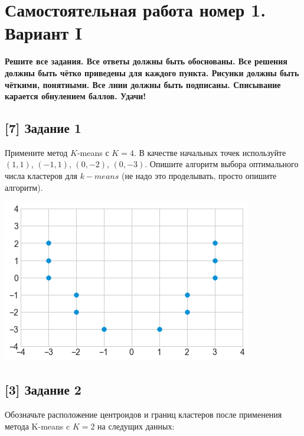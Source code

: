 \documentclass[12pt, a4paper, oneside]{article}
\begin{document}
\section*{Самостоятельная работа номер 1. Вариант I}

\textbf{Решите все задания. Все ответы должны быть обоснованы. Все решения должны быть чётко приведены для каждого пункта. Рисунки должны быть чёткими, понятными. Все лнии должны быть подписаны. Списывание карается обнулением баллов. Удачи!}

\subsection*{[7] Задание 1}

Примените метод $K$-means с $K=4$. В качестве начальных точек используйте $(1,1)$, $(-1,1)$, $(0,-2)$, $(0,-3)$.	Опишите алгоритм выбора оптимального числа кластеров для $k-means$ (не надо это проделывать, просто опишите алгоритм).

\begin{center}
\includegraphics[scale=0.5]{knn_3.png}
\end{center}


\subsection*{[3] Задание 2}

Обозначьте расположение центроидов и границ кластеров после применения метода K-means c $K=2$ на следущих данных: 
\end{document}
